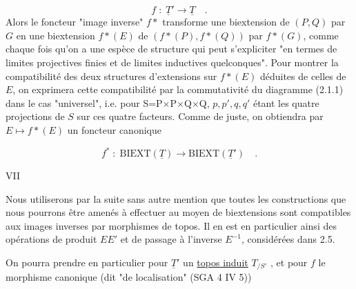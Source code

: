 \begin{equation*}
f \;:\; \underline{T}' \longrightarrow \underline{T} \quad .
\end{equation*}
Alors le foncteur "image inverse" $f*$ transforme une biextension de $(P,Q)$ par $G$ en une biextension $f*(E)$ de $(f*(P),f*(Q))$ par $f*(G)$, comme chaque fois qu'on a une espèce de structure qui peut s'expliciter "en termes de limites projectives finies et de limites inductives quelconques". Pour montrer la compatibilité des deux structures d'extensions sur $f*(E)$ déduites de celles de $E$, on exprimera cette compatibilité par la commutativité du diagramme (2.1.1) dans le cas "universel", i.e. pour S=P$\times$P$\times$Q$\times$Q, $p,p',q,q'$ étant les quatre projections de $S$ sur ces quatre facteurs. Comme de juste, on obtiendra par $E \longmapsto f*(E)$ un foncteur canonique

\begin{equation*}
f^{*} \;:\; \mathrm{BIEXT}(\underline{T}) \longrightarrow \mathrm{BIEXT}(\underline{T}') \quad .
\end{equation*}



VII

Nous utiliserons par la suite sans autre mention que toutes les constructions que nous pourrons être amenés à effectuer au moyen de biextensions sont compatibles aux images inverses par morphismes de topos. Il en est en particulier ainsi des opérations de produit $EE'$ et de passage à l'inverse $E^{-1}$, considérées dans 2.5.

On pourra prendre en particulier pour $\underline{T}'$ un \underline{topos induit} $T_{/S'}$ , et pour $f$ le morphisme canonique (dit "de localisation" (SGA 4 IV 5))

